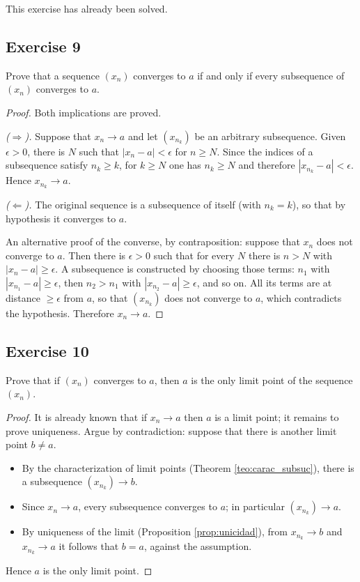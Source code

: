 \documentclass[11pt, a4paper]{article}
\begin{document}
This exercise has already been solved.

\subsection*{Exercise 9}

Prove that a sequence $(x_n)$ converges to $a$ if and only if every subsequence of $(x_n)$ converges to
$a$.

\begin{proof}
Both implications are proved.

\textit{($\Rightarrow$).} Suppose that $x_n \to a$ and let $(x_{n_k})$ be an arbitrary subsequence.
Given $\epsilon > 0$, there is $N$ such that $|x_n - a| < \epsilon$ for $n \ge N$. Since the indices of
a subsequence satisfy $n_k \ge k$, for $k \ge N$ one has $n_k \ge N$ and therefore
$|x_{n_k} - a| < \epsilon$. Hence $x_{n_k} \to a$.

\textit{($\Leftarrow$).} The original sequence is a subsequence of itself (with $n_k = k$), so
that by hypothesis it converges to $a$.

An alternative proof of the converse, by contraposition: suppose that $x_n$ does not converge to $a$.
Then there is $\epsilon > 0$ such that for every $N$ there is $n > N$ with $|x_n - a| \ge \epsilon$.
A subsequence is constructed by choosing those terms: $n_1$ with $|x_{n_1} - a| \ge \epsilon$, then
$n_2 > n_1$ with $|x_{n_2} - a| \ge \epsilon$, and so on. All its terms are at distance
$\ge \epsilon$ from $a$, so that $(x_{n_k})$ does not converge to $a$, which contradicts the hypothesis.
Therefore $x_n \to a$.
\end{proof}

\subsection*{Exercise 10}

Prove that if $(x_n)$ converges to $a$, then $a$ is the only limit point of the sequence $(x_n)$.

\begin{proof}
It is already known that if $x_n \to a$ then $a$ is a limit point; it remains to prove uniqueness. Argue by
contradiction: suppose that there is another limit point $b \neq a$.
\begin{itemize}
    \item By the characterization of limit points (Theorem \ref{teo:carac_subsuc}), there is a
    subsequence $(x_{n_k}) \to b$.
    \item Since $x_n \to a$, every subsequence converges to $a$; in particular $(x_{n_k}) \to a$.
    \item By uniqueness of the limit (Proposition \ref{prop:unicidad}), from $x_{n_k} \to b$ and
    $x_{n_k} \to a$ it follows that $b = a$, against the assumption.
\end{itemize}
Hence $a$ is the only limit point.
\end{proof}
\end{document}
